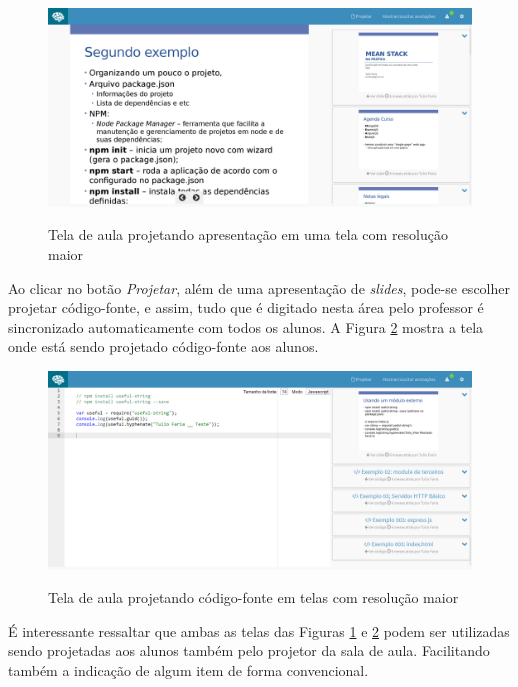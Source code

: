 \begin{figure}
\centering
\caption{Tela de aula projetando apresentação em uma tela com resolução maior}
\includegraphics[width=1.0\textwidth]{imgs/tela_aula_pc.png} 
\label{fig:tela_aula_pc} 
\end{figure}

Ao clicar no botão \emph{Projetar}, além de uma apresentação de \emph{slides}, pode-se escolher projetar código-fonte, e assim, tudo que é digitado nesta área pelo professor é sincronizado automaticamente com todos os alunos. A Figura \ref{fig:tela_aula_pc_codigo} mostra a tela onde está sendo projetado código-fonte aos alunos.

\begin{figure}
\centering
\caption{Tela de aula projetando código-fonte em telas com resolução maior}
\includegraphics[width=1.0\textwidth]{imgs/tela_aula_pc_codigo.png} 
\label{fig:tela_aula_pc_codigo} 
\end{figure}

É interessante ressaltar que ambas as telas das Figuras \ref{fig:tela_aula_pc} e \ref{fig:tela_aula_pc_codigo} podem ser utilizadas sendo projetadas aos alunos também pelo projetor da sala de aula. Facilitando também a indicação de algum item de forma convencional.

